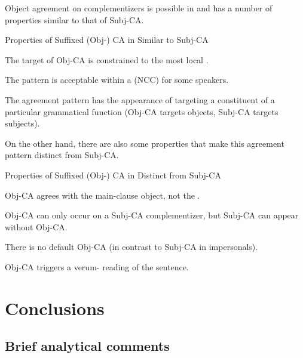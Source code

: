 \documentclass[output=paper,newtxmath,modfonts,nonflat,hidelinks]{langsci/langscibook}
\begin{document}
Object agreement on complementizers is possible in  and has a number of properties similar to that of Subj-CA.
\newpage
\begin{exe}
\ex Properties of Suffixed (Obj-) CA in  Similar to Subj-CA
\begin{xlist}

\ex The target of Obj-CA is constrained to the most local . 


\ex The pattern is acceptable within a  (NCC) for some speakers.

\ex The agreement pattern has the appearance of targeting a constituent of a particular grammatical function (Obj-CA targets objects, Subj-CA targets subjects).

\end{xlist}
\end{exe}

\noindent On the other hand, there are also some properties that make this agreement pattern distinct from Subj-CA.

\begin{exe}
\ex Properties of Suffixed (Obj-) CA in  Distinct from Subj-CA
\begin{xlist}

\ex Obj-CA agrees with the main-clause object, not the . 

\ex Obj-CA can only occur on a Subj-CA complementizer, but Subj-CA can appear without Obj-CA. 

\ex There is no default Obj-CA (in contrast to Subj-CA in impersonals). 

\ex Obj-CA triggers a verum- reading of the sentence. 

\end{xlist}
\end{exe}




\section{Conclusions} \label{Conclusions}

\subsection{Brief analytical comments}
\end{document}
